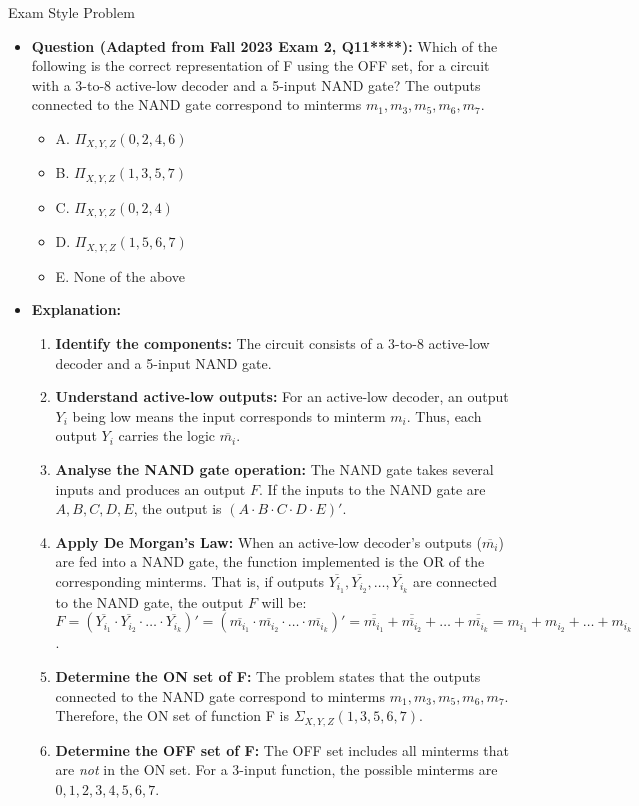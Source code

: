 \documentclass{article}
\begin{document}
Exam Style Problem

\begin{itemize}
    \item \textbf{Question (Adapted from Fall 2023 Exam 2, Q11****):} Which of the following is the correct representation of F using the OFF set, for a circuit with a 3-to-8 active-low decoder and a 5-input NAND gate? The outputs connected to the NAND gate correspond to minterms $m_1, m_3, m_5, m_6, m_7$.

        \begin{itemize}
            \item A. $\Pi_{X,Y,Z} (0, 2, 4, 6)$
            \item B. $\Pi_{X,Y,Z} (1, 3, 5, 7)$
            \item C. $\Pi_{X,Y,Z} (0, 2, 4)$
            \item D. $\Pi_{X,Y,Z} (1, 5, 6, 7)$
            \item E. None of the above
        \end{itemize}

    \item \textbf{Explanation:}

        \begin{enumerate}
            \item \textbf{Identify the components:} The circuit consists of a 3-to-8 active-low decoder and a 5-input NAND gate.
            \item \textbf{Understand active-low outputs:} For an active-low decoder, an output $Y_i$ being low means the input corresponds to minterm $m_i$. Thus, each output $Y_i$ carries the logic $\overline{m_i}$.
            \item \textbf{Analyse the NAND gate operation:} The NAND gate takes several inputs and produces an output $F$. If the inputs to the NAND gate are $A, B, C, D, E$, the output is $(A \cdot B \cdot C \cdot D \cdot E)'$.
            \item \textbf{Apply De Morgan's Law:} When an active-low decoder's outputs ($\overline{m_i}$) are fed into a NAND gate, the function implemented is the OR of the corresponding minterms. That is, if outputs $\overline{Y_{i_1}}, \overline{Y_{i_2}}, \dots, \overline{Y_{i_k}}$ are connected to the NAND gate, the output $F$ will be: $F = (\overline{Y_{i_1}} \cdot \overline{Y_{i_2}} \cdot \dots \cdot \overline{Y_{i_k}})' = (\overline{m_{i_1}} \cdot \overline{m_{i_2}} \cdot \dots \cdot \overline{m_{i_k}})' = \overline{\overline{m_{i_1}}} + \overline{\overline{m_{i_2}}} + \dots + \overline{\overline{m_{i_k}}} = m_{i_1} + m_{i_2} + \dots + m_{i_k}$.
            \item \textbf{Determine the ON set of F:} The problem states that the outputs connected to the NAND gate correspond to minterms $m_1, m_3, m_5, m_6, m_7$. Therefore, the ON set of function F is $\Sigma_{X,Y,Z}(1,3,5,6,7)$.
            \item \textbf{Determine the OFF set of F:} The OFF set includes all minterms that are \textit{not} in the ON set. For a 3-input function, the possible minterms are $0, 1, 2, 3, 4, 5, 6, 7$.


\end{enumerate}
\end{itemize}
\end{document}
